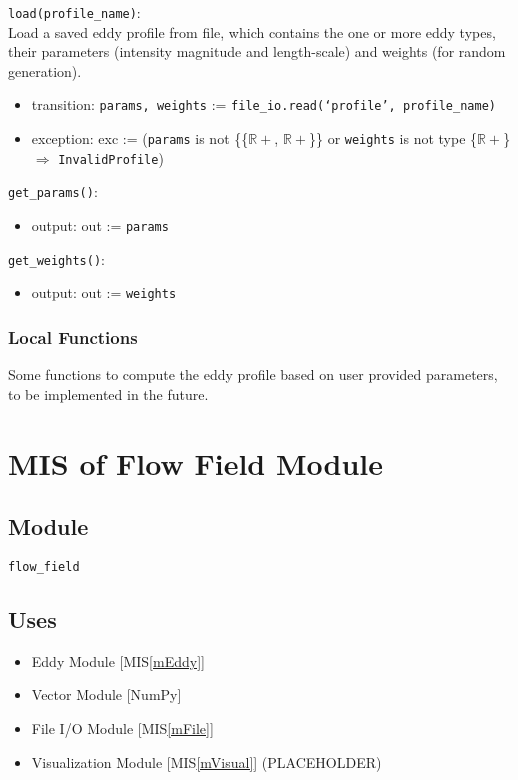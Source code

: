 \documentclass[12pt, titlepage]{article}
\begin{document}
\noindent \texttt{load(profile\_name)}:\\
Load a saved eddy profile from file, which contains the one or more eddy types, their parameters (intensity magnitude and length-scale) and weights (for random generation).
\begin{itemize}
\item transition: \texttt{params, weights} := \texttt{file\_io.read(`profile', profile\_name)}
\item exception: exc := (\texttt{params} is not \{{\{$\mathbb{R+}$, $\mathbb{R+}$\}}\} or \texttt{weights} is not type \{$\mathbb{R+}$\} $\Rightarrow$ \texttt{InvalidProfile})
\end{itemize}

\noindent \texttt{get\_params()}:
\begin{itemize}
\item output: out := \texttt{params}
\end{itemize}

\noindent \texttt{get\_weights()}:
\begin{itemize}
\item output: out := \texttt{weights}
\end{itemize}

\subsubsection{Local Functions}
Some functions to compute the eddy profile based on user provided parameters, to be implemented in the future.



\newpage
\section{MIS of Flow Field Module} \label{mFlow} 

\subsection{Module}
\texttt{flow\_field}

\subsection{Uses}
\begin{itemize}
\item Eddy Module [MIS\ref{mEddy}]
\item Vector Module [NumPy]
\item File I/O Module [MIS\ref{mFile}]
\item Visualization Module [MIS\ref{mVisual}] (PLACEHOLDER)
\end{itemize}
\end{document}
